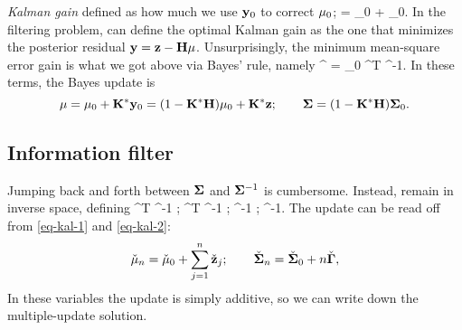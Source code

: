 \documentclass[notitlepage,openany,11pt]{report}
\theoremstyle{plain}%
\numberwithin{equation}{section}
\begin{document}
\emph{Kalman gain} defined as how much we use $\mathbf{y}_0$ to correct $\mathbf{\mu}_{0}$;
\be
\mbf{\mu} = \mbf{\mu}_{0} +  _0.
\ee
In the filtering problem, can define the optimal Kalman gain as the one that minimizes the posterior residual $\mathbf{y} = \mathbf{z} - \mathbf{H} \mathbf{\mu}$. Unsurprisingly, the minimum mean-square error gain is what we got above via Bayes' rule, namely
\be
{}^{\ast} = \mbf{\Sigma}_0 ^{T} ^{-1}.
\ee
In these terms, the Bayes update is
\begin{equation}
\mathbf{\mu} = \mathbf{\mu}_0 + \mathbf{K}^{\ast} \mathbf{y}_0 = (1 - \mathbf{K}^{\ast} \mathbf{H})\mathbf{\mu}_0 + \mathbf{K}^{\ast}\mathbf{z}; \qquad \mathbf{\Sigma} = (1 - \mathbf{K}^{\ast} \mathbf{H}) \mathbf{\Sigma}_0.
\end{equation}

%
%
%


\subsection{Information filter}

Jumping back and forth between $\mathbf{\Sigma}$ and $\mathbf{\Sigma}^{-1}$ is cumbersome. Instead, remain in inverse space, defining
\be
\check{\mbf{\Gamma}} \equiv {}^{T} \mbf{\Gamma}^{-1} ; \qquad {} \equiv {}^{T} \mbf{\Gamma}^{-1} ; 
\qquad \check{\mbf{\mu}} \equiv \mbf{\Sigma}^{-1} \mbf \mu; \qquad \check{\mbf{\Sigma}} \equiv \mbf{\Sigma}^{-1}. 
\ee
The update can be read off from \eqref{eq-kal-1} and \eqref{eq-kal-2}:
\begin{equation}
\check{\mathbf{\mu}}_{n} = \check{\mathbf{\mu}}_{0} + \sum_{j=1}^{n} \check{\mathbf{z}}_j; \qquad \check{\mathbf{\Sigma}}_n = \check{\mathbf{\Sigma}}_0 + n \check{\mathbf{\Gamma}},
\end{equation}
In these variables the update is simply additive, so we can write down the multiple-update solution.
\end{document}

